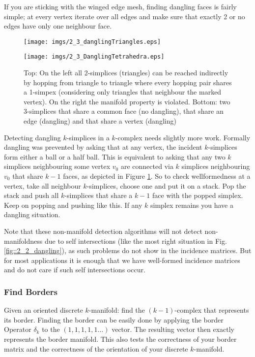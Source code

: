 If you are sticking with the winged edge mesh, finding dangling faces is fairly simple; at every vertex iterate over all edges and make sure that exactly 2 or no edges have only one neighbour face.
\begin{figure}
	\begin{center}
	\texttt{[image: imgs/2\_3\_danglingTriangles.eps]}
	\vspace{0.5cm}
	
	\texttt{[image: imgs/2\_3\_DanglingTetrahedra.eps]}
	\end{center}
	\caption{Top: On the left all 2-simplices (triangles) can be reached indirectly by hopping from triangle to triangle where every hopping pair shares a 1-simpex (considering only triangles that neighbour the marked vertex). On the right the manifold property is violated. Bottom: two 3-simplices that share a common face (no dangling), that share an edge (dangling) and that share a vertex (dangling)}
	\label{fig::2_3_dangling}
\end{figure}
Detecting dangling $k$-simplices in a $k$-complex needs slightly more work. Formally dangling was prevented by asking that at any vertex, the incident $k$-simplices form either a ball or a half ball. This is equivalent to asking that any two $k$ simplices neighbouring some vertex $v_0$ are connected via $k$ simplices neighbouring $v_0$ that share $k-1$ faces, as depicted in Figure \ref{fig::2_3_dangling}.  So to check wellformedness at a vertex, take all neighbour $k$-simplices, choose one and put it on a stack. Pop the stack and push all $k$-simplices that share a $k-1$ face with the popped simplex. Keep on popping and pushing like this. If any $k$ simplex remains you have a dangling situation. 
	
	
Note that these non-manifold detection algorithms will not detect non-manifoldness due to self intersections (like the most right situation in Fig. \ref{fig::2_2_dangling}), as such problems do not show in the incidence matrices. But for most applications it is enough that we have well-formed incidence matrices and do not care if such self intersections occur.
	
\subsubsection{Find Borders}
Given an oriented discrete $k$-manifold: find the $(k-1)$-complex that represents its border. Finding the border can be easily done by applying the border Operator $\delta_k$ to the $(1,1,1,1,1...)$ vector. The resulting vector then exactly represents the border manifold. This also tests the correctness of your border matrix and the correctness of the orientation of your discrete $k$-manifold.
	
